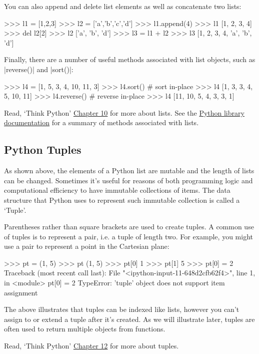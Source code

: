 You can also append and delete list elements as well as concatenate two lists:
\begin{python}
>>> l1 = [1,2,3]
>>> l2 = ['a','b','c','d']
>>> l1.append(4)
>>> l1
[1, 2, 3, 4]
>>> del l2[2]
>>> l2
['a', 'b', 'd']
>>> l3 = l1 + l2
>>> l3
[1, 2, 3, 4, 'a', 'b', 'd']
\end{python}
%
Finally, there are a number of useful methods associated with list objects, such as |reverse()| and |sort()|:
\begin{python}
>>> l4 = [1, 5, 3, 4, 10, 11, 3]
>>> l4.sort() # sort in-place
>>> l4
[1, 3, 3, 4, 5, 10, 11]
>>> l4.reverse() # reverse in-place
>>> l4
[11, 10, 5, 4, 3, 3, 1]
\end{python}

Read, `Think Python' \href{http://www.greenteapress.com/thinkpython/html/thinkpython011.html}{Chapter 10} for more about lists.  See the \href{http://docs.python.org/2.7/library/stdtypes.html#sequence-types-str-unicode-list-tuple-bytearray-buffer-xrange}{Python library documentation} for a summary of methods associated with lists.


\subsection{Python Tuples}

As shown above, the elements of a Python list are mutable and the length of lists can be changed.  Sometimes it's useful for reasons of both programming logic and computational efficiency to have immutable collections of items.  The data structure that Python uses to represent such immutable collection is called a `Tuple'.

Parentheses rather than square brackets are used to create tuples.  A common use of tuples is to represent a pair, i.e. a tuple of length two.  For example, you might use a pair to represent a point in the Cartesian plane:
%
\begin{python}
>>> pt = (1, 5)
>>> pt
(1, 5)
>>> pt[0]
1
>>> pt[1]
5
>>> pt[0] = 2
Traceback (most recent call last):
  File "<ipython-input-11-648d2cfb62f4>", line 1, in <module>
    pt[0] = 2
TypeError: 'tuple' object does not support item assignment
\end{python}
%
The above illustrates that tuples can be indexed like lists, however you can't assign to or extend a tuple after it's created. As we will illustrate later, tuples are often used to return multiple objects from functions.

Read, `Think Python' \href{http://www.greenteapress.com/thinkpython/html/thinkpython013.html}{Chapter 12} for more about tuples.



